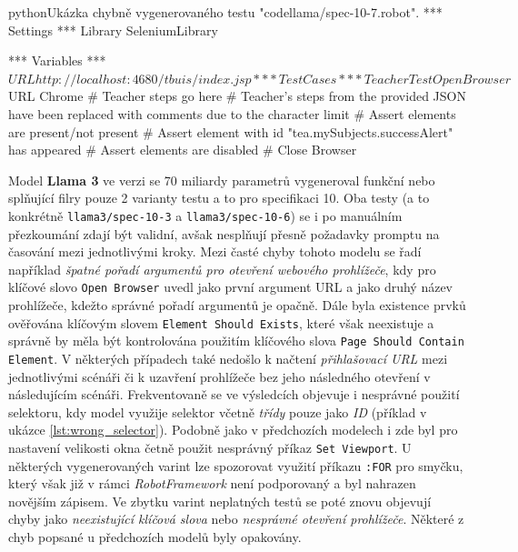 \documentclass[czech, ma, kiv, he, iso690numb, pdf, viewonly]{fasthesis}
\begin{document}
            \begin{code}{python}{Ukázka chybně vygenerovaného testu "codellama/spec-10-7.robot". \label{lst:codellama-comments}}
*** Settings ***
Library           SeleniumLibrary

*** Variables ***
${URL}            http://localhost:4680/tbuis/index.jsp

*** Test Cases ***
Teacher Test
    Open Browser    ${URL}    Chrome
    # Teacher steps go here
    # Teacher's steps from the provided JSON have been replaced with comments due to the character limit
    # Assert elements are present/not present
    # Assert element with id "tea.mySubjects.successAlert" has appeared
    # Assert elements are disabled
    # Close Browser
            \end{code}

            Model \textbf{Llama 3} ve verzi se 70 miliardy parametrů vygeneroval funkční nebo splňující filry pouze 2 varianty testu a to pro specifikaci 10. Oba testy (a to konkrétně \verb|llama3/spec-10-3| a \verb|llama3/spec-10-6|) se i po manuálním přezkoumání zdají být validní, avšak nesplňují přesně požadavky promptu na časování mezi jednotlivými kroky. Mezi časté chyby tohoto modelu se řadí například \textit{špatné pořadí argumentů pro otevření webového prohlížeče}, kdy pro klíčové slovo \verb|Open Browser| uvedl jako první argument URL a jako druhý název prohlížeče, kdežto správné pořadí argumentů je opačně. Dále byla existence prvků ověřována klíčovým slovem \verb|Element Should Exists|, které však neexistuje a správně by měla být kontrolována použitím klíčového slova \verb|Page Should Contain Element|. V některých případech také nedošlo k načtení \textit{přihlašovací URL} mezi jednotlivými scénáři či k uzavření prohlížeče bez jeho následného otevření v následujícím scénáři. Frekventovaně se ve výsledcích objevuje i nesprávné použití selektoru, kdy model využije selektor včetně \textit{třídy} pouze jako \textit{ID} (příklad v ukázce \ref{lst:wrong_selector}). Podobně jako v předchozích modelech i zde byl pro nastavení velikosti okna četně použit nesprávný příkaz \verb|Set Viewport|. U některých vygenerovaných varint lze spozorovat využití příkazu \verb|:FOR| pro smyčku, který však již v rámci \textit{RobotFramework} není podporovaný a byl nahrazen novějším zápisem. Ve zbytku varint neplatných testů se poté znovu objevují chyby jako \textit{neexistující klíčová slova} nebo \textit{nesprávné otevření prohlížeče}. Některé z chyb popsané u předchozích modelů byly opakovány.
\end{document}
